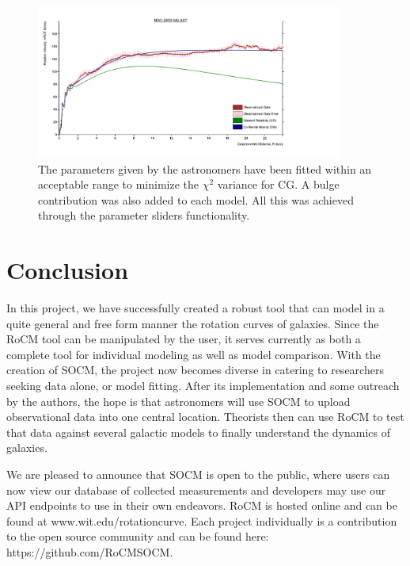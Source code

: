 \documentclass[conference]{IEEEtran-modified}
\begin{document}
\begin{figure}[h!]
\centering
\includegraphics[width=0.9\textwidth]{NGC-2403}
\caption{The parameters given by the astronomers have been fitted within an acceptable range to minimize the $\chi^2$ variance for CG. A bulge contribution was also added to each model. All this was achieved through the parameter sliders functionality.}
\label{ngc2403plot}
\end{figure}

\newpage

\section{Conclusion}
In this project, we have successfully created a robust tool that can model in a quite general and free form manner the rotation curves of galaxies.  Since the RoCM tool can be manipulated by the user, it serves currently as both a complete tool for individual modeling as well as model comparison.  With the creation of SOCM, the project now becomes diverse in catering to researchers seeking data alone, or model fitting.  After its implementation and some outreach by the authors, the hope is that astronomers will use SOCM to upload observational data into one central location. Theorists then can use RoCM to test that data against several galactic models to finally understand the dynamics of galaxies. 

	 We are pleased to announce that SOCM is open to the public, where users can now view our database of collected measurements and developers may use our API endpoints to use in their own endeavors. RoCM is hosted online and can be found at www.wit.edu/rotationcurve. Each project individually is a contribution to the open source community and can be found here: https://github.com/RoCMSOCM.
\end{document}
